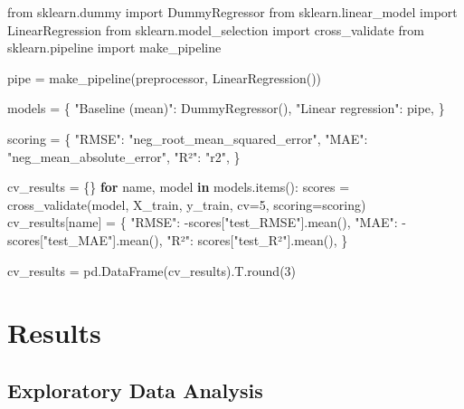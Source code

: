 \documentclass[
  letterpaper,
  DIV=11,
  numbers=noendperiod]{scrartcl}
\newenvironment{Shaded}{\begin{snugshade}}{\end{snugshade}}
\newcommand{\BuiltInTok}[1]{\textcolor[rgb]{0.00,0.23,0.31}{#1}}
\newcommand{\ControlFlowTok}[1]{\textcolor[rgb]{0.00,0.23,0.31}{\textbf{#1}}}
\newcommand{\DecValTok}[1]{\textcolor[rgb]{0.68,0.00,0.00}{#1}}
\newcommand{\ImportTok}[1]{\textcolor[rgb]{0.00,0.46,0.62}{#1}}
\newcommand{\KeywordTok}[1]{\textcolor[rgb]{0.00,0.23,0.31}{\textbf{#1}}}
\newcommand{\NormalTok}[1]{\textcolor[rgb]{0.00,0.23,0.31}{#1}}
\newcommand{\OperatorTok}[1]{\textcolor[rgb]{0.37,0.37,0.37}{#1}}
\newcommand{\StringTok}[1]{\textcolor[rgb]{0.13,0.47,0.30}{#1}}
\begin{document}
\begin{Shaded}
\begin{Highlighting}[]
\ImportTok{from}\NormalTok{ sklearn.dummy }\ImportTok{import}\NormalTok{ DummyRegressor}
\ImportTok{from}\NormalTok{ sklearn.linear\_model }\ImportTok{import}\NormalTok{ LinearRegression}
\ImportTok{from}\NormalTok{ sklearn.model\_selection }\ImportTok{import}\NormalTok{ cross\_validate}
\ImportTok{from}\NormalTok{ sklearn.pipeline }\ImportTok{import}\NormalTok{ make\_pipeline}

\NormalTok{pipe }\OperatorTok{=}\NormalTok{ make\_pipeline(preprocessor, LinearRegression())}

\NormalTok{models }\OperatorTok{=}\NormalTok{ \{}
    \StringTok{"Baseline (mean)"}\NormalTok{: DummyRegressor(),}
    \StringTok{"Linear regression"}\NormalTok{: pipe,}
\NormalTok{\}}

\NormalTok{scoring }\OperatorTok{=}\NormalTok{ \{}
    \StringTok{"RMSE"}\NormalTok{: }\StringTok{"neg\_root\_mean\_squared\_error"}\NormalTok{,}
    \StringTok{"MAE"}\NormalTok{: }\StringTok{"neg\_mean\_absolute\_error"}\NormalTok{,}
    \StringTok{"R²"}\NormalTok{: }\StringTok{"r2"}\NormalTok{,}
\NormalTok{\}}

\NormalTok{cv\_results }\OperatorTok{=}\NormalTok{ \{\}}
\ControlFlowTok{for}\NormalTok{ name, model }\KeywordTok{in}\NormalTok{ models.items():}
\NormalTok{    scores }\OperatorTok{=}\NormalTok{ cross\_validate(model, X\_train, y\_train, cv}\OperatorTok{=}\DecValTok{5}\NormalTok{, scoring}\OperatorTok{=}\NormalTok{scoring)}
\NormalTok{    cv\_results[name] }\OperatorTok{=}\NormalTok{ \{}
        \StringTok{"RMSE"}\NormalTok{: }\OperatorTok{{-}}\NormalTok{scores[}\StringTok{"test\_RMSE"}\NormalTok{].mean(),}
        \StringTok{"MAE"}\NormalTok{: }\OperatorTok{{-}}\NormalTok{scores[}\StringTok{"test\_MAE"}\NormalTok{].mean(),}
        \StringTok{"R²"}\NormalTok{: scores[}\StringTok{"test\_R²"}\NormalTok{].mean(),}
\NormalTok{    \}}

\NormalTok{cv\_results }\OperatorTok{=}\NormalTok{ pd.DataFrame(cv\_results).T.}\BuiltInTok{round}\NormalTok{(}\DecValTok{3}\NormalTok{)}
\end{Highlighting}
\end{Shaded}

\section{Results}\label{results}

\subsection{Exploratory Data Analysis}\label{exploratory-data-analysis}
\end{document}
